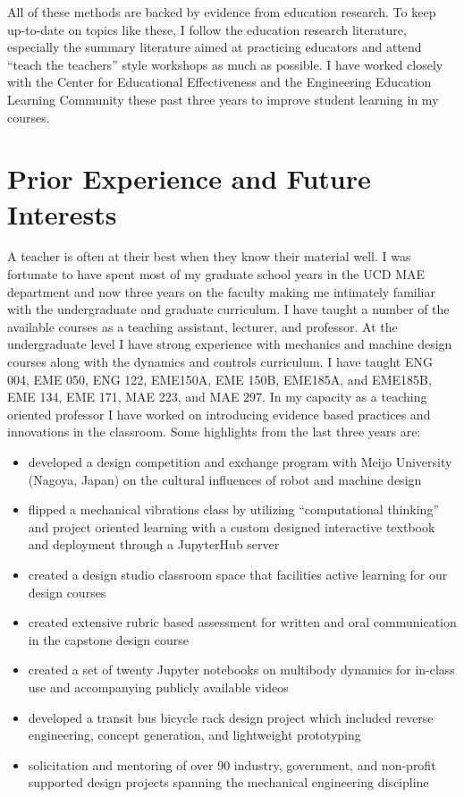 \documentclass[titlepage]{article}
\begin{document}
All of these methods are backed by evidence from education research. To keep
up-to-date on topics like these, I follow the education research literature,
especially the summary literature aimed at practicing educators and attend
``teach the teachers'' style workshops as much as possible. I have worked
closely with the Center for Educational Effectiveness and the Engineering
Education Learning Community these past three years to improve student learning
in my courses.

\section*{Prior Experience and Future Interests}
%
A teacher is often at their best when they know their material well. I was
fortunate to have spent most of my graduate school years in the UCD MAE
department and now three years on the faculty making me intimately familiar
with the undergraduate and graduate curriculum. I have taught a number of the
available courses as a teaching assistant, lecturer, and professor. At the
undergraduate level I have strong experience with mechanics and machine design
courses along with the dynamics and controls curriculum. I have taught ENG 004,
EME 050, ENG 122, EME150A, EME 150B, EME185A, and EME185B, EME 134, EME 171,
MAE 223, and MAE 297. In my capacity as a teaching oriented professor I have
worked on introducing evidence based practices and innovations in the
classroom. Some highlights from the last three years are:

\begin{itemize}
    \setlength\itemsep{0.1em}
  \item developed a design competition and exchange program with Meijo
    University (Nagoya, Japan) on the cultural influences of robot and machine
    design
  \item flipped a mechanical vibrations class by utilizing ``computational
    thinking'' and project oriented learning with a custom designed interactive
    textbook and deployment through a JupyterHub server
  \item created a design studio classroom space that facilities active learning
    for our design courses
  \item created extensive rubric based assessment for written and oral
    communication in the capstone design course
  \item created a set of twenty Jupyter notebooks on multibody dynamics for
    in-class use and accompanying publicly available videos
  \item developed a transit bus bicycle rack design project which included
    reverse engineering, concept generation, and lightweight prototyping
  \item solicitation and mentoring of over 90 industry, government, and
    non-profit supported design projects spanning the mechanical engineering
    discipline
\end{itemize}
\end{document}
